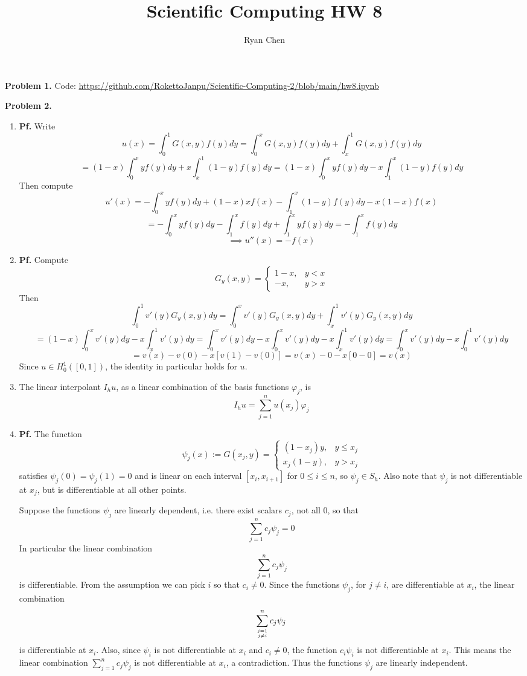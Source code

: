 \documentclass{article}
\title{Scientific Computing HW 8}
\author{Ryan Chen}
\def\tbf#1{\textbf{#1}}
\newcommand{\vp}{\varphi}
\newcommand{\pf}{\tbf{Pf. }}
\newcommand{\imp}{\implies}
\begin{document}
	
\maketitle



\tbf{Problem 1.} Code: \url{https://github.com/RokettoJanpu/Scientific-Computing-2/blob/main/hw8.ipynb}



\tbf{Problem 2.}

\begin{enumerate}[label=(\alph*)]
	
\item \pf Write
$$u(x) = \int_0^1 G(x,y)f(y)dy
= \int_0^x G(x,y)f(y)dy + \int_x^1 G(x,y)f(y)dy$$
$$= (1-x)\int_0^x yf(y)dy + x\int_x^1 (1-y)f(y)dy
= (1-x)\int_0^x yf(y)dy - x\int_1^x (1-y)f(y)dy$$
Then compute
$$u'(x) = -\int_0^x yf(y)dy + (1-x)xf(x) - \int_1^x (1-y)f(y)dy - x(1-x)f(x)$$
$$= -\int_0^x yf(y)dy - \int_1^x f(y)dy + \int_1^x yf(y)dy
= -\int_1^x f(y)dy$$
$$\imp u''(x) = -f(x)$$


\item \pf Compute
$$G_y(x,y) =
\begin{cases}
	1-x, & y<x\\
	-x, & y>x
\end{cases}$$
Then
$$\int_0^1 v'(y)G_y(x,y)dy = \int_0^x v'(y)G_y(x,y)dy + \int_x^1 v'(y)G_y(x,y)dy$$
$$= (1-x)\int_0^x v'(y)dy - x\int_x^1 v'(y)dy
= \int_0^x v'(y)dy - x\int_0^x v'(y)dy - x\int_x^1 v'(y)dy
= \int_0^x v'(y)dy - x\int_0^1 v'(y)dy$$
$$= v(x) - v(0) - x[v(1) - v(0)]
= v(x) - 0 - x[0 - 0]
= v(x)$$
Since $u\in H^1_0([0,1])$, the identity in particular holds for $u$.


\item The linear interpolant $I_hu$, as a linear combination of the basis functions $\vp_j$, is
$$I_hu = \sum_{j=1}^n u(x_j)\vp_j$$


\item \pf The function
$$\psi_j(x) := G(x_j,y) =
\begin{cases}
	(1-x_j)y, & y\le x_j\\
	x_j(1-y), & y>x_j
\end{cases}$$
satisfies $\psi_j(0)=\psi_j(1)=0$ and is linear on each interval $[x_i,x_{i+1}]$ for $0\le i\le n$, so $\psi_j\in S_h$. Also note that $\psi_j$ is not differentiable at $x_j$, but is differentiable at all other points.

Suppose the functions $\psi_j$ are linearly dependent, i.e. there exist scalars $c_j$, not all 0, so that
$$\sum_{j=1}^nc_j\psi_j=0$$
In particular the linear combination
$$\sum_{j=1}^nc_j\psi_j$$
is differentiable. From the assumption we can pick $i$ so that $c_i\ne0$. Since the functions $\psi_j$, for $j\ne i$, are differentiable at $x_i$, the linear combination
$$\sum_{j=1 \atop j\ne i}^n c_j\psi_j$$
is differentiable at $x_i$. Also, since $\psi_i$ is not differentiable at $x_i$ and $c_i\ne0$, the function $c_i\psi_i$ is not differentiable at $x_i$. This means the linear combination $\sum_{j=1}^nc_j\psi_j$ is not differentiable at $x_i$, a contradiction. Thus the functions $\psi_j$ are linearly independent.


\end{enumerate}
\end{document}
